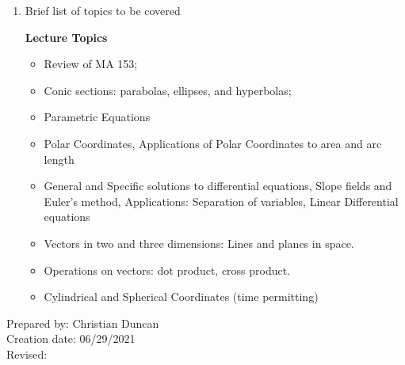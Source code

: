 \begin{enumerate}[1.]
\item Brief list of topics to be covered\\
  {\bfseries
    Lecture Topics
    \begin{itemize}
    \item Review of MA 153;
    \item Conic sections: parabolas, ellipses, and hyperbolas;
    \item Parametric Equations
    \item Polar Coordinates, Applications of Polar Coordinates to area and arc length
    \item General and Specific solutions to differential equations, Slope fields and Euler’s method, Applications: Separation of variables, Linear Differential equations
    \item Vectors in two and three dimensions: Lines and planes in space.
    \item Operations on vectors: dot product, cross product.
    \item Cylindrical and Spherical Coordinates (time permitting) 
    \end{itemize}
  }
\end{enumerate}

\noindent Prepared by: Christian Duncan\\
\noindent Creation date: 06/29/2021\\
\noindent Revised:\\
